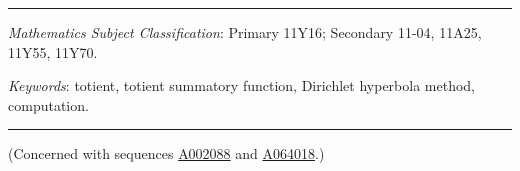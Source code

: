 \documentclass[12pt]{article}
\newcommand{\seqnum}[1]{\href{https://oeis.org/#1}{#1}}
\begin{document}
\nocite{*}

\setlength{\bibitemsep}{\parskip}
\printbibliography[heading=bibnumbered]

\bigskip
\hrule
\bigskip

 \emph{Mathematics Subject Classification}: Primary 11Y16; Secondary 11-04, 11A25, 11Y55, 11Y70.

\noindent \emph{Keywords}: totient, totient summatory function, Dirichlet hyperbola method, computation.


\bigskip
\hrule
\bigskip

\noindent (Concerned with sequences \seqnum{A002088} and \seqnum{A064018}.)
\end{document}
